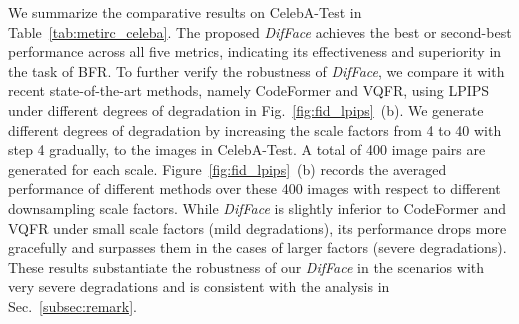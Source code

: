 \documentclass[10pt,twocolumn,letterpaper]{article}
\begin{document}
We summarize the comparative results on CelebA-Test in Table~\ref{tab:metirc_celeba}. The proposed \textit{DifFace} achieves the best or second-best performance across all five metrics, indicating its effectiveness and superiority in the task of BFR.
To further verify the robustness of \textit{DifFace}, we compare it with recent state-of-the-art methods, namely CodeFormer and VQFR, using LPIPS under different degrees of degradation in Fig.~\ref{fig:fid_lpips}~(b). We generate different degrees of degradation by increasing the scale factors from 4 to 40 with step 4 gradually, to the images in CelebA-Test. A total of 400 image pairs are generated for each scale. Figure~\ref{fig:fid_lpips}~(b) records the averaged performance of different methods over these 400 images with respect to different downsampling scale factors. While \textit{DifFace} is slightly inferior to CodeFormer and VQFR under small scale factors (mild degradations), its performance drops more gracefully and surpasses them in the cases of larger factors (severe degradations). These results substantiate the robustness of our \textit{DifFace} in the scenarios with very severe degradations and is consistent with the analysis in Sec.~\ref{subsec:remark}.
\end{document}
